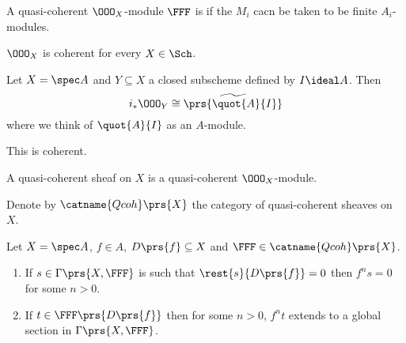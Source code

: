 \documentclass[10pt,a4paper,twoside,openany,hidelinks]{book}
\begin{document}
\begin{definition}
A quasi-coherent $\OOO_X$-module $\FFF$ is  if the $M_i$ cacn be taken to be finite $A_i$-modules.
\end{definition}

\begin{remark}
$\OOO_X$ is coherent for every $X \in \Sch$.
\end{remark}

\begin{example}
Let $X = \spec A$ and $Y \subseteq X$ a closed subscheme defined by $I \ideal A$. Then
\[i_* \OOO_Y \cong \widetilde{\prs{\quot{A}{I}}}\]
where we think of $\quot{A}{I}$ as an $A$-module.

This is coherent.
\end{example}

\begin{definition}
A quasi-coherent sheaf on $X$ is a quasi-coherent $\OOO_X$-module.
\end{definition}

\begin{notation}
Denote by $\catname{Qcoh}\prs{X}$ the category of quasi-coherent sheaves on $X$.
\end{notation}

\begin{lemma}
Let $X = \spec A$, $f \in A$, $D\prs{f} \subseteq X$ and $\FFF \in \catname{Qcoh}\prs{X}$.
\begin{enumerate}
\item If $s \in \Gamma\prs{X,\FFF}$ is such that $\rest{s}{D\prs{f}} = 0$ then $f^n s = 0$ for some $n > 0$.
\item If $t \in \FFF\prs{D\prs{f}}$ then for some $n>0$, $f^n t$ extends to a global section in $\Gamma\prs{X, \FFF}$.
\end{enumerate}
\end{lemma}
\end{document}

